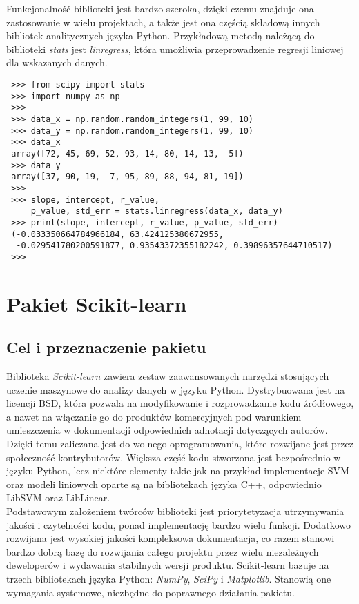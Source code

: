 Funkcjonalność biblioteki jest bardzo szeroka, dzięki czemu znajduje ona zastosowanie w wielu projektach, a także jest ona częścią składową innych bibliotek analitycznych języka Python.
Przykładową metodą należącą do biblioteki \textit{stats} jest \textit{linregress}, która umożliwia przeprowadzenie regresji liniowej dla wskazanych danych.
\begin{lstlisting}
 >>> from scipy import stats
 >>> import numpy as np
 >>>
 >>> data_x = np.random.random_integers(1, 99, 10)
 >>> data_y = np.random.random_integers(1, 99, 10)
 >>> data_x
 array([72, 45, 69, 52, 93, 14, 80, 14, 13,  5])
 >>> data_y
 array([37, 90, 19,  7, 95, 89, 88, 94, 81, 19])
 >>>
 >>> slope, intercept, r_value,
     p_value, std_err = stats.linregress(data_x, data_y)
 >>> print(slope, intercept, r_value, p_value, std_err)
 (-0.033350664784966184, 63.424125380672955,
  -0.029541780200591877, 0.93543372355182242, 0.39896357644710517)
 >>> 
\end{lstlisting}

\section{Pakiet Scikit-learn}

\subsection{Cel i przeznaczenie pakietu}
Biblioteka \textit{Scikit-learn} zawiera zestaw zaawansowanych narzędzi stosujących uczenie maszynowe do analizy danych w języku Python.
Dystrybuowana jest na licencji BSD, która pozwala na modyfikowanie i rozprowadzanie kodu źródłowego, a nawet na włączanie go do produktów komercyjnych pod warunkiem umieszczenia w dokumentacji odpowiednich adnotacji dotyczących autorów.
Dzięki temu zaliczana jest do wolnego oprogramowania, które rozwijane jest przez społeczność kontrybutorów.
Większa część kodu stworzona jest bezpośrednio w języku Python, lecz niektóre elementy takie jak na przykład implementacje SVM oraz modeli liniowych oparte są na bibliotekach języka C++, odpowiednio LibSVM oraz LibLinear\cite{scikit_article}.\\

Podstawowym założeniem twórców biblioteki jest priorytetyzacja utrzymywania jakości i czytelności kodu, ponad implementację bardzo wielu funkcji\cite{scikit_article}.
Dodatkowo rozwijana jest wysokiej jakości kompleksowa dokumentacja, co razem stanowi bardzo dobrą bazę do rozwijania całego projektu przez wielu niezależnych deweloperów i wydawania stabilnych wersji produktu.
Scikit-learn bazuje na trzech bibliotekach języka Python: \textit{NumPy}, \textit{SciPy} i \textit{Matplotlib}. Stanowią one wymagania systemowe, niezbędne do poprawnego działania pakietu.\\

